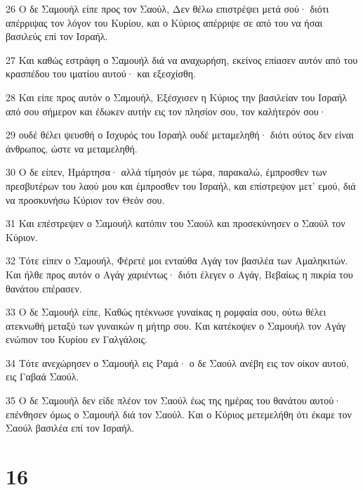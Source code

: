 \par 26 Ο δε Σαμουήλ είπε προς τον Σαούλ, Δεν θέλω επιστρέψει μετά σού· διότι απέρριψας τον λόγον του Κυρίου, και ο Κύριος απέρριψε σε από του να ήσαι βασιλεύς επί τον Ισραήλ.
\par 27 Και καθώς εστράφη ο Σαμουήλ διά να αναχωρήση, εκείνος επίασεν αυτόν από του κρασπέδου του ιματίου αυτού· και εξεσχίσθη.
\par 28 Και είπε προς αυτόν ο Σαμουήλ, Εξέσχισεν η Κύριος την βασιλείαν του Ισραήλ από σου σήμερον και έδωκεν αυτήν εις τον πλησίον σου, τον καλήτερόν σου·
\par 29 ουδέ θέλει ψευσθή ο Ισχυρός του Ισραήλ ουδέ μεταμεληθή· διότι ούτος δεν είναι άνθρωπος, ώστε να μεταμεληθή.
\par 30 Ο δε είπεν, Ημάρτησα· αλλά τίμησόν με τώρα, παρακαλώ, έμπροσθεν των πρεσβυτέρων του λαού μου και έμπροσθεν του Ισραήλ, και επίστρεψον μετ' εμού, διά να προσκυνήσω Κύριον τον Θεόν σου.
\par 31 Και επέστρεψεν ο Σαμουήλ κατόπιν του Σαούλ και προσεκύνησεν ο Σαούλ τον Κύριον.
\par 32 Τότε είπεν ο Σαμουήλ, Φέρετέ μοι ενταύθα Αγάγ τον βασιλέα των Αμαληκιτών. Και ήλθε προς αυτόν ο Αγάγ χαριέντως· διότι έλεγεν ο Αγάγ, Βεβαίως η πικρία του θανάτου επέρασεν.
\par 33 Ο δε Σαμουήλ είπε, Καθώς ητέκνωσε γυναίκας η ρομφαία σου, ούτω θέλει ατεκνωθή μεταξύ των γυναικών η μήτηρ σου. Και κατέκοψεν ο Σαμουήλ τον Αγάγ ενώπιον του Κυρίου εν Γαλγάλοις.
\par 34 Τότε ανεχώρησεν ο Σαμουήλ εις Ραμά· ο δε Σαούλ ανέβη εις τον οίκον αυτού, εις Γαβαά Σαούλ.
\par 35 Ο δε Σαμουήλ δεν είδε πλέον τον Σαούλ έως της ημέρας του θανάτου αυτού· επένθησεν όμως ο Σαμουήλ διά τον Σαούλ. Και ο Κύριος μετεμελήθη ότι έκαμε τον Σαούλ βασιλέα επί τον Ισραήλ.

\chapter{16}


